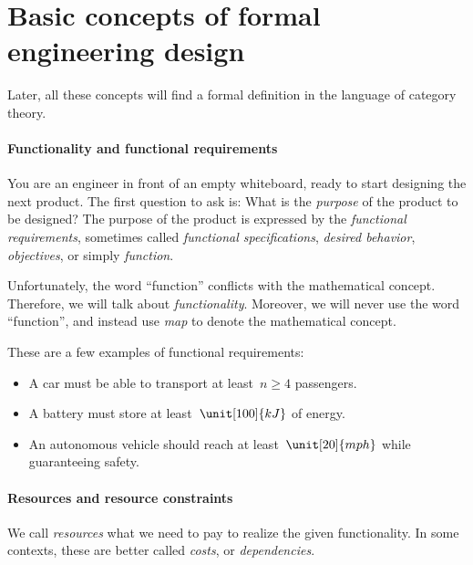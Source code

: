 
\section[Formal engineering design]{Basic concepts of formal engineering design}

Later, all these concepts will find a formal definition in the language of category theory.

\paragraph{Functionality and functional requirements}
You are an engineer in front of an empty whiteboard, ready to start designing the next product.
The first question to ask is: What is the \emph{purpose} of the product to be designed?
The purpose of the product is expressed by the \emph{functional requirements}, sometimes called
\emph{functional specifications}, \emph{desired behavior}, \emph{objectives}, or simply \emph{function}.

Unfortunately, the word ``function'' conflicts with the mathematical concept.
Therefore, we will talk about \emph{functionality}.
Moreover, we will never use the word ``function'', and instead use \emph{map} to denote the mathematical concept.

\begin{example}
    These are a few examples of functional requirements:
    \begin{itemize}
        \item A car must be able to transport at least~$n \geq 4$ passengers.
        \item A battery must store at least~$\unit[100]{kJ}$ of energy.
        \item An autonomous vehicle should reach at least~$\unit[20]{mph}$ while guaranteeing safety.
    \end{itemize}
\end{example}

\paragraph{Resources and resource constraints}

We call \emph{resources} what we need to pay to realize the given functionality.
In some contexts, these are better called \emph{costs}, or \emph{dependencies}.

